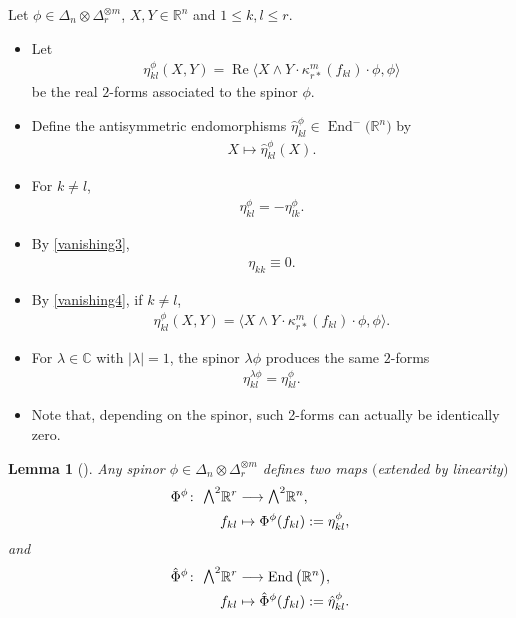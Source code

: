 \documentclass[10pt,a4paper]{amsart}
\newcommand{\ext}{\raise1pt\hbox{\small$\bigwedge$}}
\newcommand{\lra}{\longrightarrow}
\numberwithin{equation}{section}
\newtheorem{Lemma}[Theorem]{Lemma}
\begin{document}
\begin{Definition} Let $\phi\in\Delta_n\otimes\Delta_r^{\otimes m}$, $X,Y\in\mathbb{R}^n$ and $1\leq k,l\leq r$.
\begin{itemize}\itemsep=0pt
\item Let
\begin{gather*} \eta_{kl}^{\phi} (X,Y) = \operatorname{Re}\big\langle X\wedge Y\cdot \kappa_{r*}^m(f_{kl})\cdot \phi,\phi\big\rangle \end{gather*}
be the real $2$-forms associated to the spinor $\phi$.
\item Define the antisymmetric endomorphisms $\hat\eta_{kl}^\phi\in\operatorname{End}^-\big(\mathbb{R}^n\big)$ by
\begin{gather*}X\mapsto \hat\eta_{kl}^\phi(X).\end{gather*}
\end{itemize}
\end{Definition}

\begin{Remark}\quad
\begin{itemize}\itemsep=0pt
 \item For $k\not= l$,
\begin{gather*}\eta_{kl}^\phi = - \eta_{lk}^\phi.\end{gather*}
\item By \eqref{vanishing3},
\begin{gather*}\eta_{kk}\equiv 0.\end{gather*}
 \item By \eqref{vanishing4}, if $k\not= l$,
\begin{gather*}\eta_{kl}^{\phi} (X,Y) =\big\langle X\wedge Y\cdot \kappa_{r*}^m(f_{kl})\cdot \phi,\phi\big\rangle .\end{gather*}
\item For $\lambda\in \mathbb{C}$ with $|\lambda|=1$, the spinor $\lambda\phi$ produces the same $2$-forms
\begin{gather*}\eta_{kl}^{\lambda\phi}= \eta_{kl}^\phi.\end{gather*}
\item Note that, depending on the spinor, such 2-forms can actually be identically zero.
\end{itemize}
\end{Remark}

\begin{Lemma}[\cite{Espinosa-Herrera}]\label{lemma:morphisms}
Any spinor $\phi\in\Delta_n\otimes\Delta_r^{\otimes m}$ defines two maps $($extended by linearity$)$
\begin{align*}
\Phi^\phi\colon \ \ext^2 \mathbb{R}^r&\lra \ext^2 \mathbb{R}^n,\\
f_{kl} &\mapsto \Phi^\phi(f_{kl}):=\eta_{kl}^{\phi},
\end{align*}
and
\begin{align*}
\hat\Phi^\phi\colon \ \ext^2 \mathbb{R}^r&\lra \operatorname{End}\big(\mathbb{R}^n\big),\\
f_{kl} &\mapsto \hat\Phi^\phi(f_{kl}):=\hat\eta_{kl}^{\phi}.
\end{align*}
\end{Lemma}
\end{document}
